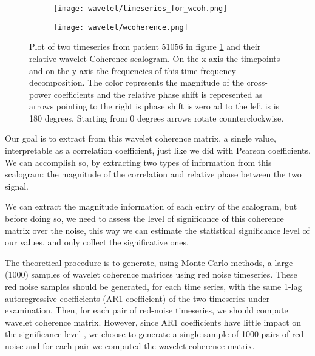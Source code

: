 \documentclass[11pt]{report}
\begin{document}
\begin{figure}
\begin{subfigure}{0.5\textwidth}
\texttt{[image: wavelet/timeseries\_for\_wcoh.png]}
\caption{}
\label{fig:wcoherence_timeseries}
\end{subfigure}
\begin{subfigure}{0.5\textwidth}
\texttt{[image: wavelet/wcoherence.png]}
\caption{}
\label{fig:wcoherence_scalogram}
\end{subfigure}
\caption{Plot of two timeseries from patient 51056 in figure \ref{fig:wcoherence_timeseries} and their relative wavelet Coherence scalogram.
On the x axis the timepoints and on the y axis the frequencies of this time-frequency decomposition.
The color represents the magnitude of the cross-power coefficients and the relative phase shift is represented as arrows pointing to the right is phase shift is zero ad to the left is is 180 degrees. Starting from 0 degrees arrows rotate counterclockwise.
}
\label{fig:wcoherence}
\end{figure}



Our goal is to extract from this wavelet coherence matrix, a single value, interpretable as a correlation coefficient, just like we did with Pearson coefficients.
We can accomplish so, by extracting two types of information from this scalogram: the magnitude of the correlation and relative phase between the two signal.

We can extract the magnitude information of each entry of the scalogram, but before doing so, we need to assess the level of significance of this coherence matrix over the noise, this way we can estimate the statistical significance level of our values, and only collect the significative ones.

The theoretical procedure \cite{grinsted-2004} \cite{bernas-2018} is to generate, using Monte Carlo methods, a large (1000) samples of wavelet coherence matrices using red noise timeseries. \cite{hartmann-2014}
These red noise samples should be generated, for each time series, with the same 1-lag autoregressive coefficients (AR1 coefficient) of the two timeseries under examination.
Then, for each pair of red-noise timeseries, we should compute wavelet coherence matrix.
However, since AR1 coefficients have little impact on the significance level \cite{grinsted-2004}, we choose to generate a single sample of 1000 pairs of red noise and for each pair we computed the wavelet coherence matrix.
\end{document}
